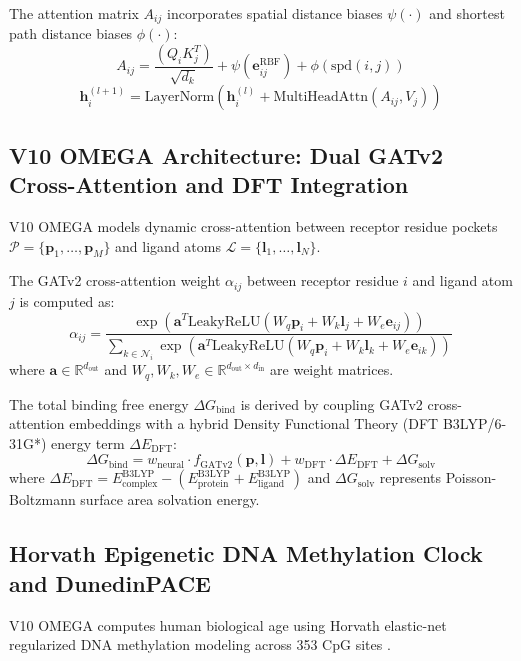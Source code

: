 \documentclass[10pt,journal,compsoc]{IEEEtran}
\begin{document}
The attention matrix $A_{ij}$ incorporates spatial distance biases $\psi(\cdot)$ and shortest path distance biases $\phi(\cdot)$:
\begin{equation}
A_{ij} = \frac{(Q_i K_j^T)}{\sqrt{d_k}} + \psi\left(\mathbf{e}_{ij}^{\text{RBF}}\right) + \phi(\text{spd}(i,j))
\end{equation}
\begin{equation}
\mathbf{h}_i^{(l+1)} = \text{LayerNorm}\left( \mathbf{h}_i^{(l)} + \text{MultiHeadAttn}\left(A_{ij}, V_j\right) \right)
\end{equation}

\subsection{V10 OMEGA Architecture: Dual GATv2 Cross-Attention and DFT Integration}
V10 OMEGA models dynamic cross-attention between receptor residue pockets $\mathcal{P} = \{\mathbf{p}_1, \dots, \mathbf{p}_M\}$ and ligand atoms $\mathcal{L} = \{\mathbf{l}_1, \dots, \mathbf{l}_N\}$.

The GATv2 cross-attention weight $\alpha_{ij}$ between receptor residue $i$ and ligand atom $j$ is computed as:
\begin{equation}
\alpha_{ij} = \frac{\exp\left(\mathbf{a}^T \text{LeakyReLU}\left(W_q \mathbf{p}_i + W_k \mathbf{l}_j + W_e \mathbf{e}_{ij}\right)\right)}{\sum_{k \in \mathcal{N}_i} \exp\left(\mathbf{a}^T \text{LeakyReLU}\left(W_q \mathbf{p}_i + W_k \mathbf{l}_k + W_e \mathbf{e}_{ik}\right)\right)}
\end{equation}
where $\mathbf{a} \in \mathbb{R}^{d_{\text{out}}}$ and $W_q, W_k, W_e \in \mathbb{R}^{d_{\text{out}} \times d_{\text{in}}}$ are weight matrices.

The total binding free energy $\Delta G_{\text{bind}}$ is derived by coupling GATv2 cross-attention embeddings with a hybrid Density Functional Theory (DFT B3LYP/6-31G*) energy term $\Delta E_{\text{DFT}}$:
\begin{equation}
\Delta G_{\text{bind}} = w_{\text{neural}} \cdot f_{\text{GATv2}}(\mathbf{p}, \mathbf{l}) + w_{\text{DFT}} \cdot \Delta E_{\text{DFT}} + \Delta G_{\text{solv}}
\end{equation}
where $\Delta E_{\text{DFT}} = E_{\text{complex}}^{\text{B3LYP}} - \left( E_{\text{protein}}^{\text{B3LYP}} + E_{\text{ligand}}^{\text{B3LYP}} \right)$ and $\Delta G_{\text{solv}}$ represents Poisson-Boltzmann surface area solvation energy.

\subsection{Horvath Epigenetic DNA Methylation Clock and DunedinPACE}
V10 OMEGA computes human biological age using Horvath elastic-net regularized DNA methylation modeling across 353 CpG sites \cite{horvath2013}.
\end{document}
